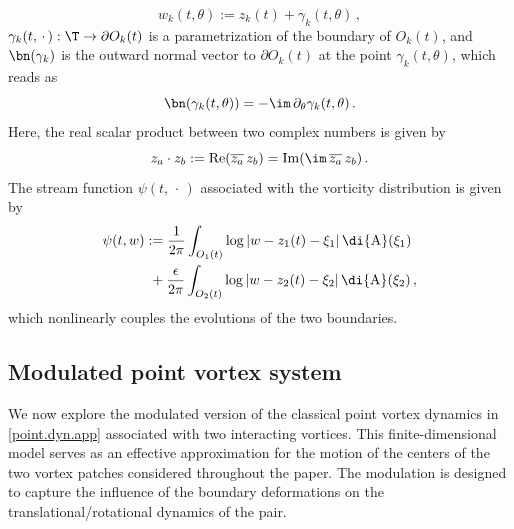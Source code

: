 \documentclass[a4paper,reqno,10pt]{article}
\newcommand{\pa}{\partial}
\newcommand{\wrta}{\,\di {\rm A}}
\begin{document}
\begin{equation}\label{contour.form}
	w_k(t,\theta) := z_{k}(t) + \gamma_{k}(t,\theta) \,,
\end{equation}
 $\gamma_{k}(t,\,\cdot\,):\T\to\pa O_k(t)$ is a parametrization of the boundary of $O_{k}(t)$, and $\bn(\gamma_{k})$ is the  outward normal vector to $\pa O_{k}(t)$ at the point $\gamma_{k}(t,\theta)$, which reads as
\begin{equation}\label{normal.gamma.app}
	\bn(\gamma_{k}(t,\theta)) = -\im\, \pa_{\theta}\gamma_{k}(t,\theta) \,.
\end{equation}
Here, the real scalar product between two complex numbers is given by
\begin{equation}\label{real.scalar.prod.app}
	z_a \cdot z_b := {\rm Re} (  \overline{z_a}\,z_b) = {\rm Im} (\im \,\overline{z_a}\, z_b) \,.
\end{equation}
 The stream function $\psi(t,\,\cdot\,)$ associated with the vorticity distribution is given by
 \begin{equation}\label{stream.gen.app}
 	\begin{aligned}
 		\psi(t,w) & := \frac{1}{2\pi} \int_{O_{1}(t)} \log |w - z_{1}(t) -\xi_{1} | \wrta(\xi_{1}) \\
 		& \   + \frac{\epsilon}{2\pi} \int_{O_{2}(t)} \log |w - z_{2}(t) - \xi_{2} | \wrta(\xi_{2}) \,,
 	\end{aligned}
 \end{equation}
 which nonlinearly couples the evolutions of the two boundaries.
 
 
 \subsection{Modulated point vortex system}
We now explore the modulated version of the classical point vortex dynamics in \eqref{point.dyn.app} associated with two interacting vortices. This finite-dimensional model serves as an effective approximation for the motion of the centers of the two vortex patches considered throughout the paper. The modulation is designed to capture the influence of the boundary deformations on the translational/rotational dynamics of the pair.
\end{document}
